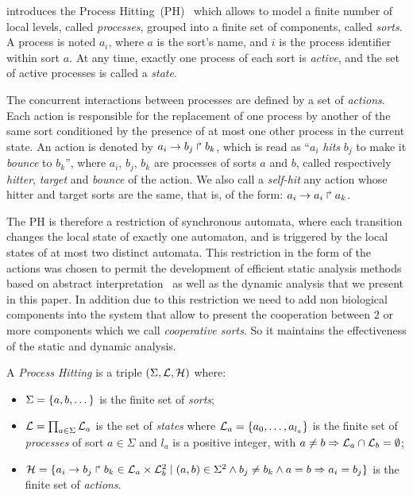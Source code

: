 \label{sec:prem-def}

 introduces the Process Hitting~(PH)~\cite{PMR10-TCSB}
which allows to model a finite number of local levels,
called \emph{processes},
grouped into a finite set of components, called \emph{sorts}.
A process is noted $a_i$, where $a$ is the sort's name,
and $i$ is the process identifier within sort $a$.
At any time, exactly one process of each sort is \emph{active},
and the set of active processes is called a \emph{state}.

The concurrent interactions between processes are defined by a set of \emph{actions}.
Each action is responsible for the replacement of one process by another of the same sort
conditioned by the presence of at most one other process in the current state.
An action is denoted by $a_i\rightarrow b_j\Rsh b_k$, which is read as
``$a_i$ \emph{hits} $b_j$ to make it \emph{bounce} to $b_k$'',
where $a_i$, $b_j$, $b_k$ are processes of sorts $a$ and $b$,
called respectively \emph{hitter}, \emph{target} and
\emph{bounce} of the action.
We also call a \emph{self-hit} any action whose hitter and target sorts are the same,
that is, of the form: $a_i\rightarrow a_i\Rsh a_k$.

The PH is therefore a restriction of synchronous automata, where each transition
changes the local state of exactly one automaton,
and is triggered by the local states of at most two distinct automata.
This restriction in the form of the actions was chosen to permit
the development of efficient static analysis methods
based on abstract interpretation~\cite{PMR12-MSCS} as well as the dynamic analysis that we present in this paper. In addition due to this restriction we need to add non biological components into the system that allow to present the cooperation between $2$ or more components which we call \emph{cooperative sorts}. So it maintains the effectiveness of the static and dynamic analysis.

\begin{definition}\label{def:PH}
  A \emph{Process Hitting} is a triple $(\Sigma,\mathcal{L},\mathcal{H})$ where:
  \begin{itemize}
    \item  $\Sigma = \{a,b,\dots\}$ is the finite set of \emph{sorts};
    \item  $\mathcal{L} = \prod_{a\in\Sigma} \mathcal{L}_a$ is the set of \emph{states} where
      $\mathcal{L}_a = \{a_0,\dots,a_{l_a}\}$
      is the finite set of \emph{processes} of sort $a\in\Sigma$
      and $l_a$ is a positive integer, with $a\neq b\Rightarrow \mathcal{L}_a \cap \mathcal{L}_b = \emptyset$;
    \item  $\mathcal{H} = \{ a_i\rightarrow b_j\Rsh b_k \in \mathcal{L}_a \times \mathcal{L}_b^2 \mid
      (a,b) \in \Sigma^2 \wedge b_j\neq b_k \wedge a=b\Rightarrow a_i=b_j\}$
      is the finite set of \emph{actions}.
  \end{itemize}
\end{definition}

